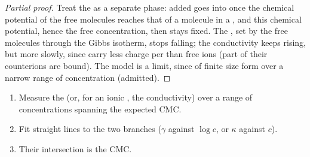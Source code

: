 \begin{proof}[Partial proof]
Treat the  as a separate phase: added  goes into  once
the chemical potential of the free molecules reaches that of a molecule in a
, and this chemical potential, hence the free concentration, then stays
fixed. The , set by the free molecules through the Gibbs
isotherm, stops falling; the conductivity keeps rising, but more slowly, since
 carry less charge per  than free ions (part of their
counterions are bound). The model is a limit, since  of finite size
form over a narrow range of concentration (admitted).
\end{proof}

\begin{method}\label{met:b3:colloids:cmc}
\begin{enumerate}
  \item Measure the  (or, for an ionic , the
        conductivity) over a range of concentrations spanning the expected
        CMC.
  \item Fit straight lines to the two branches ($\gamma$ against $\log c$, or $\kappa$ against $c$).
  \item Their intersection is the CMC.
\end{enumerate}
\end{method}

